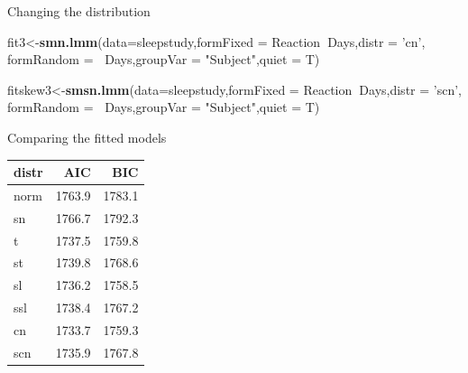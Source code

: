 \documentclass[
  ignorenonframetext,
]{beamer}
\newenvironment{Shaded}{\begin{snugshade}}{\end{snugshade}}
\newcommand{\DataTypeTok}[1]{\textcolor[rgb]{0.13,0.29,0.53}{#1}}
\newcommand{\KeywordTok}[1]{\textcolor[rgb]{0.13,0.29,0.53}{\textbf{#1}}}
\newcommand{\NormalTok}[1]{#1}
\newcommand{\OperatorTok}[1]{\textcolor[rgb]{0.81,0.36,0.00}{\textbf{#1}}}
\newcommand{\StringTok}[1]{\textcolor[rgb]{0.31,0.60,0.02}{#1}}
\begin{document}
\begin{frame}[fragile]{Changing the distribution}
\begin{Shaded}
\begin{Highlighting}[]
\NormalTok{fit3<-}\KeywordTok{smn.lmm}\NormalTok{(}\DataTypeTok{data=}\NormalTok{sleepstudy,}\DataTypeTok{formFixed =}\NormalTok{ Reaction}\OperatorTok{~}\NormalTok{Days,}\DataTypeTok{distr =} \StringTok{'cn'}\NormalTok{,}
              \DataTypeTok{formRandom =} \OperatorTok{~}\NormalTok{Days,}\DataTypeTok{groupVar =} \StringTok{"Subject"}\NormalTok{,}\DataTypeTok{quiet =}\NormalTok{ T)}
\end{Highlighting}
\end{Shaded}

\begin{Shaded}
\begin{Highlighting}[]
\NormalTok{fitskew3<-}\KeywordTok{smsn.lmm}\NormalTok{(}\DataTypeTok{data=}\NormalTok{sleepstudy,}\DataTypeTok{formFixed =}\NormalTok{ Reaction}\OperatorTok{~}\NormalTok{Days,}\DataTypeTok{distr =} \StringTok{'scn'}\NormalTok{,}
                  \DataTypeTok{formRandom =} \OperatorTok{~}\NormalTok{Days,}\DataTypeTok{groupVar =} \StringTok{"Subject"}\NormalTok{,}\DataTypeTok{quiet =}\NormalTok{ T)}
\end{Highlighting}
\end{Shaded}

\end{frame}

\begin{frame}{Comparing the fitted models}
\protect\hypertarget{comparing-the-fitted-models}{}

\begin{longtable}[]{@{}lrr@{}}
\toprule
distr & AIC & BIC\tabularnewline
\midrule
\endhead
norm & 1763.9 & 1783.1\tabularnewline
sn & 1766.7 & 1792.3\tabularnewline
t & 1737.5 & 1759.8\tabularnewline
st & 1739.8 & 1768.6\tabularnewline
sl & 1736.2 & 1758.5\tabularnewline
ssl & 1738.4 & 1767.2\tabularnewline
cn & 1733.7 & 1759.3\tabularnewline
scn & 1735.9 & 1767.8\tabularnewline
\bottomrule
\end{longtable}

\end{frame}
\end{document}
